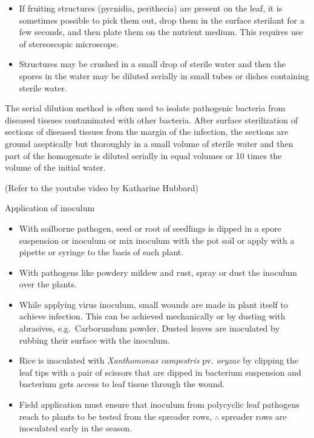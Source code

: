 \documentclass[11pt,dvipsnames,ignorenonframetext,aspectratio=169]{beamer}
\providecommand{\tightlist}{%
  \setlength{\itemsep}{0pt}\setlength{\parskip}{0pt}}
\begin{document}
\begin{frame}{}
\protect\hypertarget{section-1}{}
\begin{itemize}
\tightlist
\item
  If fruiting structures (pycnidia, perithecia) are present on the leaf,
  it is sometimes possible to pick them out, drop them in the surface
  sterilant for a few seconds, and then plate them on the nutrient
  medium. This requires use of stereoscopic microscope.
\item
  Structures may be crushed in a small drop of sterile water and then
  the spores in the water may be diluted serially in small tubes or
  dishes containing sterile water.
\end{itemize}

\begin{block}{}
\protect\hypertarget{section-2}{}
The serial dilution method is often used to isolate pathogenic bacteria
from diseased tissues contaminated with other bacteria. After surface
sterilization of sections of diseased tissues from the margin of the
infection, the sections are ground aseptically but thoroughly in a small
volume of sterile water and then part of the homogenate is diluted
serially in equal volumes or 10 times the volume of the initial water.

(\scriptsize Refer to the youtube video by Katharine Hubbard)
\end{block}
\end{frame}

\begin{frame}{Application of inoculum}
\protect\hypertarget{application-of-inoculum}{}
\small

\begin{itemize}
\tightlist
\item
  With soilborne pathogen, seed or root of seedlings is dipped in a
  spore suspension or inoculum or mix inoculum with the pot soil or
  apply with a pipette or syringe to the basis of each plant.
\item
  With pathogens like powdery mildew and rust, spray or dust the
  inoculum over the plants.
\item
  While applying virus inoculum, small wounds are made in plant itself
  to achieve infection. This can be achieved mechanically or by dusting
  with abrasives, e.g.~Carborundum powder. Dusted leaves are inoculated
  by rubbing their surface with the inoculum.
\item
  Rice is inoculated with \emph{Xanthomonas campestris} pv.
  \emph{oryzae} by clipping the leaf tips with a pair of scissors that
  are dipped in bacterium suspension and bacterium gets access to leaf
  tissue through the wound.
\item
  Field application must ensure that inoculum from polycyclic leaf
  pathogens reach to plants to be tested from the spreader rows,
  \(\therefore\) spreader rows are inoculated early in the season.
\end{itemize}
\end{frame}
\end{document}
